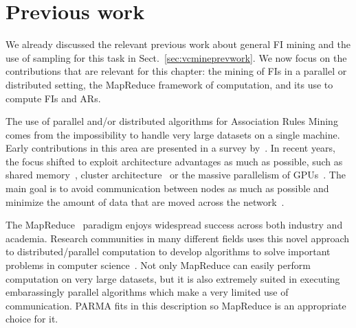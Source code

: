 \section{Previous work}
\label{sec:parmarelated}
We already discussed the relevant previous work about general FI mining and the
use of sampling for this task in Sect.~\ref{sec:vcmineprevwork}. We now focus on the
contributions that are relevant for this chapter: the mining of FIs in a
parallel or distributed setting, the MapReduce framework of computation, and its
use to compute FIs and ARs.

The use of parallel and/or distributed algorithms for Association Rules Mining comes from the
impossibility to handle very large datasets on a single machine. Early
contributions in this area are presented in a survey by~\citet{Zaki99}.
In recent years, the focus shifted to exploit architecture advantages as much as
possible, such as shared memory~\citep{JinYA05}, cluster
architecture~\citep{BuehrerPTKS07} or the massive parallelism of
GPUs~\citep{FangEtAl08}. The main goal is to avoid communication
between nodes as much as possible and minimize the amount of data that are moved
across the 
network~\citep{CongHHP05,EHZaiane06,LiuLZT07,OzkuralUA11}.

The MapReduce~\citep{DeanG08} paradigm enjoys widespread success
across both industry and academia. Research communities in many different
fields uses this novel approach to distributed/parallel computation to develop
algorithms to solve important problems in computer
science~\citep{ChierichettiKT10,ChuKLYBNO06,GoodrichSZ11,LinS10,PietracaprinaPRSU12}.
Not only MapReduce can easily perform computation on very large datasets, but it
is also extremely suited in executing embarassingly parallel algorithms which
make a very limited use of communication. PARMA fits in this description so
MapReduce is an appropriate choice for it.

